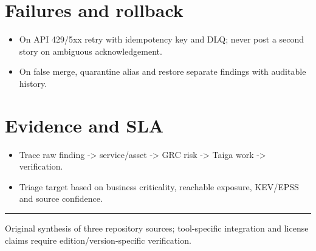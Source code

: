 \documentclass[10pt,letterpaper]{article}
\begin{document}
\section{Failures and rollback}
\begin{itemize}
\item On API 429/5xx retry with idempotency key and DLQ; never post a second story on ambiguous acknowledgement.
\item On false merge, quarantine alias and restore separate findings with auditable history.
\end{itemize}
\section{Evidence and SLA}
\begin{itemize}
\item Trace raw finding -> service/asset -> GRC risk -> Taiga work -> verification.
\item Triage target based on business criticality, reachable exposure, KEV/EPSS and source confidence.
\end{itemize}
\vfill\noindent\color{muted}\rule{\linewidth}{0.4pt}\par\scriptsize Original synthesis of three repository sources; tool-specific integration and license claims require edition/version-specific verification.\normalsize
\end{document}
